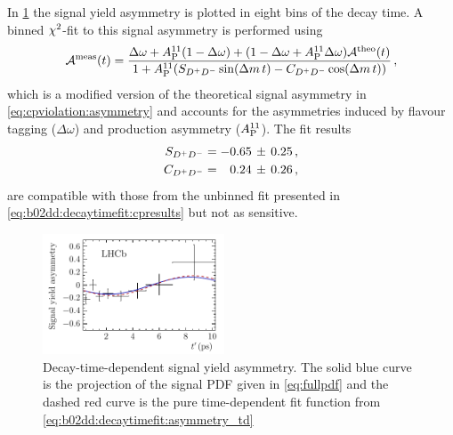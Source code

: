 In \cref{fig:b02dd:decaytimefit:asymmetry} the signal yield asymmetry is
plotted in eight bins of the decay time. A binned $\chi^2$-fit to this signal
asymmetry is performed using
\begin{align}
{\mathcal A}^{\text{meas}}(t) = \frac{\Delta\omega + A_\text{P}^{11}(1 - \Delta\omega) + (1 - \Delta\omega + A_\text{P}^{11}\Delta\omega){\mathcal A}^{\text{theo}}(t)}{1 + A_\text{P}^{11}(S_{{{D}^+}{{D}^-}} \sin({\Delta m}\,t) - C_{{{D}^+}{{D}^-}} \cos({\Delta m}\,t))}\,,
\label{eq:b02dd:decaytimefit:asymmetry_td}
\end{align}
which is a modified version of the theoretical signal asymmetry in
\cref{eq:cpviolation:asymmetry} and accounts for the asymmetries induced by
flavour tagging ($\Delta\omega$) and production asymmetry ($A_\text{P}^{11}$).
The fit results
\begin{align*}
\begin{split}
  S_{{{D}^+}{{D}^-}}                &= -0.65\,\pm\,0.25 \,, \\
  C_{{{D}^+}{{D}^-}}                &= \phantom{-}0.24\,\pm\,0.26 \,,
\end{split}
\end{align*}
are compatible with those from the unbinned fit presented in
\cref{eq:b02dd:decaytimefit:cpresults} but not as sensitive.
\begin{figure}[htb]
\centering
\includegraphics[width=0.48\textwidth]{07-B02DD/tikz/pdf/Asymmetry.pdf}
\caption{Decay-time-dependent signal yield asymmetry. The solid blue curve is the
projection of the signal PDF given in \cref{eq:fullpdf} and the dashed red curve is the
pure time-dependent fit function from
\cref{eq:b02dd:decaytimefit:asymmetry_td}}
\label{fig:b02dd:decaytimefit:asymmetry}
\end{figure}

\FloatBarrier
